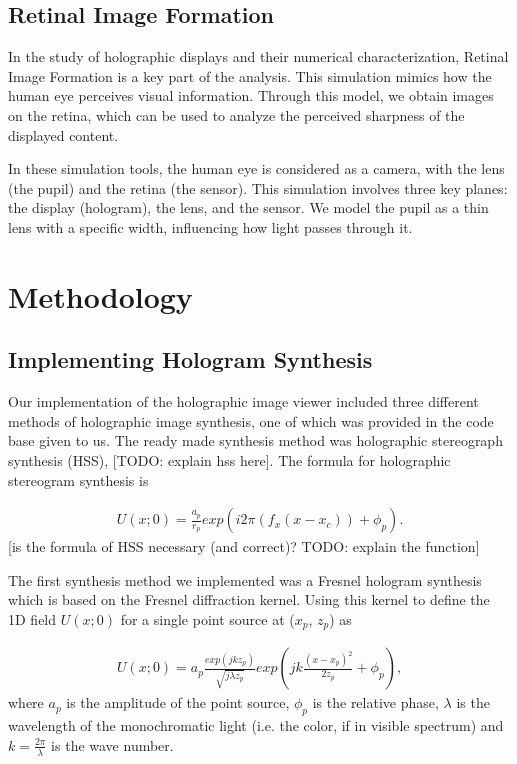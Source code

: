 \documentclass[12pt,a4paper,english
]{tunithesis}
\begin{document}
\section{Retinal Image Formation}
In the study of holographic displays and their numerical characterization, Retinal Image Formation is a key part of the analysis. This simulation mimics how the human eye perceives visual information. Through this model, we obtain images on the retina, which can be used to analyze the perceived sharpness of the displayed content.

In these simulation tools, the human eye is considered as a camera, with the lens (the pupil) and the retina (the sensor). This simulation involves three key planes: the display (hologram), the lens, and the sensor. We model the pupil as a thin lens with a specific width, influencing how light passes through it.



\chapter{Methodology}
\label{sec:methodology}

\section{Implementing Hologram Synthesis}
Our implementation of the holographic image viewer included three different methods of holographic image synthesis, one of which was provided in the code base given to us. The ready made synthesis method was holographic stereograph synthesis (HSS), [TODO: explain hss here]. The formula for holographic stereogram synthesis is 

\begin{align}
  \label{eq:field}
  U(x;0) = \frac{a_p}{r_p}exp(i 2\pi(f_x(x-x_c))+\phi_p).
\end{align}
[is the formula of HSS necessary (and correct)? TODO: explain the function]


The first synthesis method we implemented was a Fresnel hologram synthesis which is based on the Fresnel diffraction kernel. Using this kernel to define the 1D field $U(x;0)$ for a single point source at  ($x_p$, $z_p$) as

\begin{align}
  \label{eq:field}
  U(x;0) = a_p\frac{exp(j k z_p)}{\sqrt{j \lambda z_p}}exp(jk\frac{(x-x_p)^2}{2z_p}+\phi_p),
\end{align}
where $a_p$ is the amplitude of the point source, $\phi_p$ is the relative phase, $\lambda$ is the wavelength of the monochromatic light (i.e. the color, if in visible spectrum) and $k = \frac{2\pi}{\lambda}$ is the wave number.
\end{document}
